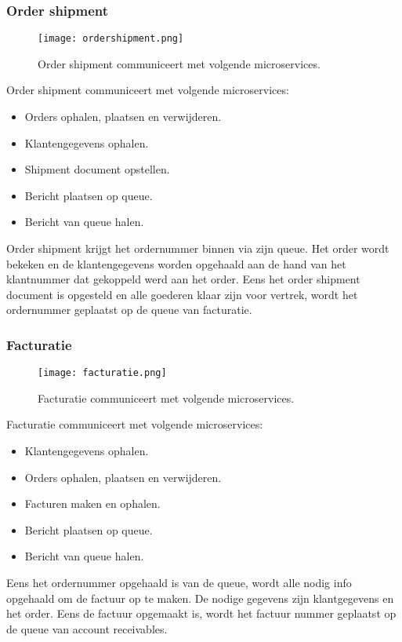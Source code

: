 \subsubsection{Order shipment}
\begin{figure}[h!]
	\texttt{[image: ordershipment.png]}
	\caption{Order shipment communiceert met volgende microservices.}
	\centering
\end{figure}
Order shipment communiceert met volgende microservices:
\begin{itemize}
	\item Orders ophalen, plaatsen en verwijderen.
	\item Klantengegevens ophalen.
	\item Shipment document opstellen.
	\item Bericht plaatsen op queue.
	\item Bericht van queue halen.
\end{itemize}
Order shipment krijgt het ordernummer binnen via zijn queue. Het order wordt bekeken en de klantengegevens worden opgehaald aan de hand van het klantnummer dat gekoppeld werd aan het order. Eens het order shipment document is opgesteld en alle goederen klaar zijn voor vertrek, wordt het ordernummer geplaatst op de queue van facturatie.

\subsubsection{Facturatie}
\begin{figure}[h!]
	\texttt{[image: facturatie.png]}
	\caption{Facturatie communiceert met volgende microservices.}
	\centering
\end{figure}
Facturatie communiceert met volgende microservices:
\begin{itemize}
	\item Klantengegevens ophalen.
	\item Orders ophalen, plaatsen en verwijderen.
	\item Facturen maken en ophalen.
	\item Bericht plaatsen op queue.
	\item Bericht van queue halen.
\end{itemize}
Eens het ordernummer opgehaald is van de queue, wordt alle nodig info opgehaald om de factuur op te maken. De nodige gegevens zijn klantgegevens en het order. Eens de factuur opgemaakt is, wordt het factuur nummer geplaatst op de queue van account receivables.

